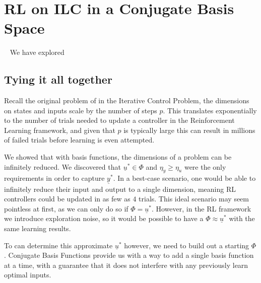 
\FloatBarrier\section{RL on ILC in a Conjugate Basis Space}
~\label{sec:rl_on_conjugate_basis_ilc}
We have explored

\FloatBarrier\subsection{Tying it all together}
Recall the original problem of in the Iterative Control Problem, the dimensions on states and inputs scale by the number of steps $p$. This translates exponentially to the number of trials needed to update a controller in the Reinforcement Learning framework, and given that $p$ is typically large this can result in millions of failed trials before learning is even attempted.

We showed that with basis functions, the dimensions of a problem can be infinitely reduced. We discovered that $\underline{u}^\ast \in \Phi$ and $\eta_y \geq \eta_u$ were the only requirements in order to capture $\underline{y}^\ast$. In a best-case scenario, one would be able to infinitely reduce their input and output to a single dimension, meaning RL controllers could be updated in as few as $4$ trials. This ideal scenario may seem pointless at first, as we can only do so if $\Phi = \underline{u}^\ast$. However, in the RL framework we introduce exploration noise, so it would be possible to have a $\Phi \approx \underline{u}^\ast$ with the same learning results.

To can determine this approximate $\underline{u}^\ast$ however, we need to build out a starting $\Phi$. Conjugate Basis Functions provide us with a way to add a single basis function at a time, with a guarantee that it does not interfere with any previously learn optimal inputs. 

